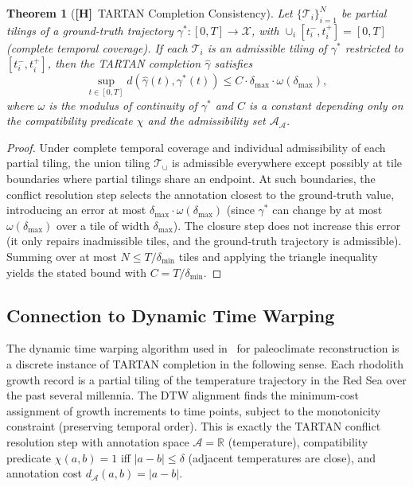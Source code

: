 \documentclass[11pt, oneside]{article}
\numberwithin{equation}{section}
\newcommand{\ClaimH}{\textcolor{rsvpgray}{\textbf{[H]}}}
\theoremstyle{rsvpstyle}
\newtheorem{theorem}{Theorem}[section]
\theoremstyle{remark}
\newcommand{\Adm}{\mathcal{A}}
\newcommand{\Rspace}{\mathbb{R}}
\begin{document}
\begin{theorem}[\ClaimH\ TARTAN Completion Consistency]
\label{thm:tartan-complete}
Let $\{\mathcal{T}_i\}_{i=1}^N$ be partial tilings of a ground-truth trajectory
$\gamma^* : [0,T] \to \mathcal{X}$, with $\cup_i [t_i^-, t_i^+] = [0,T]$ (complete
temporal coverage). If each $\mathcal{T}_i$ is an admissible tiling of $\gamma^*$
restricted to $[t_i^-, t_i^+]$, then the TARTAN completion $\hat\gamma$ satisfies
\begin{equation}
  \sup_{t \in [0,T]} d(\hat\gamma(t), \gamma^*(t)) \leq C \cdot \delta_\text{max}
  \cdot \omega(\delta_\text{max}),
\end{equation}
where $\omega$ is the modulus of continuity of $\gamma^*$ and $C$ is a constant
depending only on the compatibility predicate $\chi$ and the admissibility set
$\Adm_\mathcal{A}$.
\end{theorem}

\begin{proof}
Under complete temporal coverage and individual admissibility of each partial
tiling, the union tiling $\mathcal{T}_\cup$ is admissible everywhere except
possibly at tile boundaries where partial tilings share an endpoint. At such
boundaries, the conflict resolution step selects the annotation closest to the
ground-truth value, introducing an error at most $\delta_\text{max} \cdot \omega(\delta_\text{max})$
(since $\gamma^*$ can change by at most $\omega(\delta_\text{max})$ over a tile of
width $\delta_\text{max}$). The closure step does not increase this error (it only
repairs inadmissible tiles, and the ground-truth trajectory is admissible). Summing
over at most $N \leq T/\delta_\text{min}$ tiles and applying the triangle inequality
yields the stated bound with $C = T/\delta_\text{min}$.
\end{proof}

\subsection{Connection to Dynamic Time Warping}

The dynamic time warping algorithm used in~\cite{Li2026Rhodoliths} for paleoclimate
reconstruction is a discrete instance of TARTAN completion in the following sense.
Each rhodolith growth record is a partial tiling of the temperature trajectory in
the Red Sea over the past several millennia. The DTW alignment finds the minimum-cost
assignment of growth increments to time points, subject to the monotonicity constraint
(preserving temporal order). This is exactly the TARTAN conflict resolution step
with annotation space $\mathcal{A} = \Rspace$ (temperature), compatibility predicate
$\chi(a, b) = 1$ iff $|a - b| \leq \delta$ (adjacent temperatures are close), and
annotation cost $d_\mathcal{A}(a, b) = |a - b|$.
\end{document}
